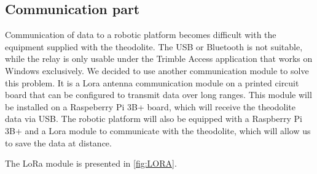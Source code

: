 \documentclass[10pt,letterpaper,oneside]{article}
\begin{document}

\subsection{Communication part}

Communication of data to a robotic platform becomes difficult with the equipment supplied with the theodolite.
The USB or Bluetooth is not suitable, while the relay is only usable under the Trimble Access application that works on Windows exclusively.
We decided to use another communication module to solve this problem.
It is a Lora antenna communication module on a printed circuit board that can be configured to transmit data over long ranges.
This module will be installed on a Raspeberry Pi 3B+ board, which will receive the theodolite data via USB.
The robotic platform will also be equipped with a Raspberry Pi 3B+ and a Lora module to communicate with the theodolite, which will allow us to save the data at distance.

The LoRa module is presented in \autoref{fig:LORA}.

%
\end{document}
